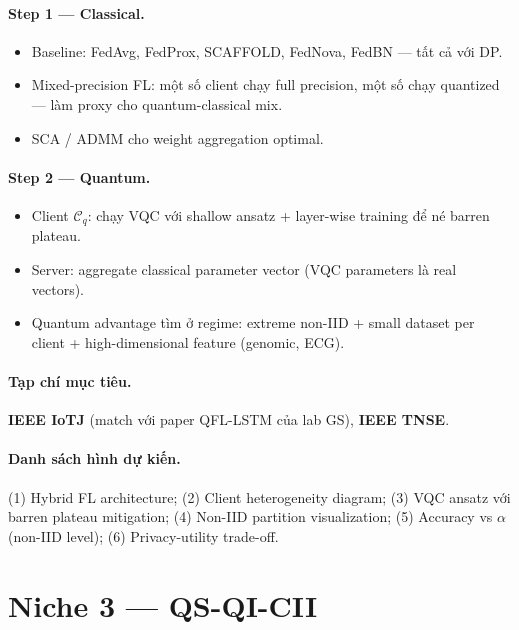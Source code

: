 \documentclass[11pt,a4paper]{article}
\begin{document}
\paragraph{Step 1 --- Classical.}
\begin{itemize}
  \item Baseline: FedAvg, FedProx, SCAFFOLD, FedNova, FedBN --- tất cả với DP.
  \item Mixed-precision FL: một số client chạy full precision, một số chạy quantized --- làm proxy cho quantum-classical mix.
  \item SCA / ADMM cho weight aggregation optimal.
\end{itemize}

\paragraph{Step 2 --- Quantum.}
\begin{itemize}
  \item Client $\mathcal{C}_q$: chạy VQC với shallow ansatz + layer-wise training để né barren plateau.
  \item Server: aggregate classical parameter vector (VQC parameters là real vectors).
  \item Quantum advantage tìm ở regime: extreme non-IID + small dataset per client + high-dimensional feature (genomic, ECG).
\end{itemize}

\paragraph{Tạp chí mục tiêu.}
\textbf{IEEE IoTJ} (match với paper QFL-LSTM của lab GS), \textbf{IEEE TNSE}.

\paragraph{Danh sách hình dự kiến.}
(1) Hybrid FL architecture; (2) Client heterogeneity diagram; (3) VQC ansatz với barren plateau mitigation; (4) Non-IID partition visualization; (5) Accuracy vs $\alpha$ (non-IID level); (6) Privacy-utility trade-off.

\section{Niche 3 --- QS-QI-CII}
\end{document}
